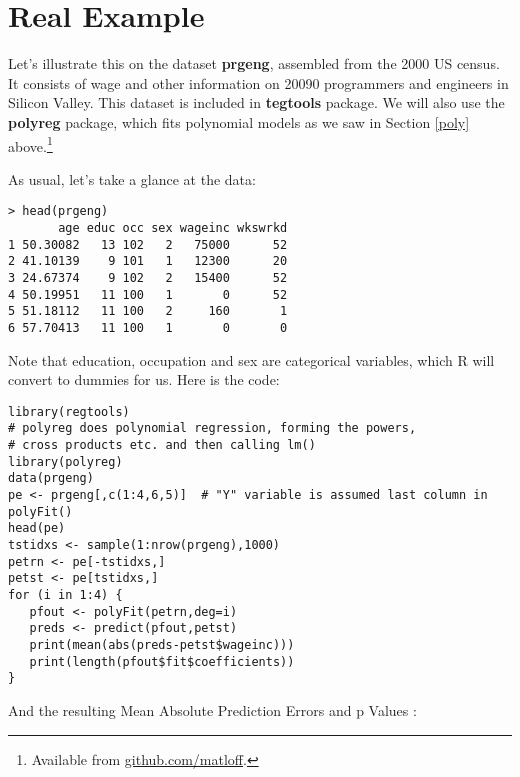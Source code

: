 \section{Real Example}
\label{prgengex}

\iffalse
library(regtools)
# polyreg does polynomial regression, forming the powers, 
# cross products etc. and then calling lm()
library(polyreg)  
data(prgeng)
pe <- prgeng[,c(1:4,6,5)]  # "Y" variable is assumed last column in polyFit()
head(pe)
tstidxs <- sample(1:nrow(prgeng),1000) 
petrn <- pe[-tstidxs,]
petst <- pe[tstidxs,]
for (i in 1:10) {
   pfout <- polyFit(petrn,deg=i)
   preds <- predict(pfout,petst)
   print(mean(abs(preds-petst$wageinc)))
}
\fi

Let's illustrate this on the dataset \textbf{prgeng}, assembled from the
2000 US census.  It consists of wage and other information on 20090
programmers and engineers in Silicon Valley.  This dataset is included
in \textbf{tegtools} package.  We will also use the \textbf{polyreg}
package, which fits polynomial models as we saw in Section \ref{poly}
above.\footnote{Available from \url{github.com/matloff}.}  

As usual, let's take a glance at the data:

\begin{lstlisting}
> head(prgeng)
       age educ occ sex wageinc wkswrkd
1 50.30082   13 102   2   75000      52
2 41.10139    9 101   1   12300      20
3 24.67374    9 102   2   15400      52
4 50.19951   11 100   1       0      52
5 51.18112   11 100   2     160       1
6 57.70413   11 100   1       0       0
\end{lstlisting}

Note that education, occupation and sex are categorical variables,
which R will convert to dummies for us.  Here is the code:

\begin{lstlisting}
library(regtools)
# polyreg does polynomial regression, forming the powers, 
# cross products etc. and then calling lm()
library(polyreg)
data(prgeng)
pe <- prgeng[,c(1:4,6,5)]  # "Y" variable is assumed last column in polyFit()
head(pe)
tstidxs <- sample(1:nrow(prgeng),1000) 
petrn <- pe[-tstidxs,]
petst <- pe[tstidxs,]
for (i in 1:4) {
   pfout <- polyFit(petrn,deg=i)
   preds <- predict(pfout,petst)
   print(mean(abs(preds-petst$wageinc)))
   print(length(pfout$fit$coefficients))
}
\end{lstlisting}

And the resulting Mean Absolute Prediction Errors and p Values :


